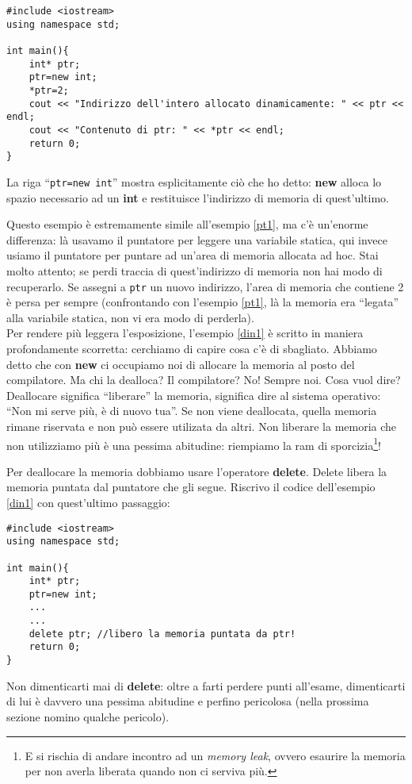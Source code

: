 \begin{lstlisting}
#include <iostream>
using namespace std;

int main(){
	int* ptr;
	ptr=new int;
	*ptr=2;
	cout << "Indirizzo dell'intero allocato dinamicamente: " << ptr << endl;
	cout << "Contenuto di ptr: " << *ptr << endl;
	return 0;
}
\end{lstlisting}\label{din1}

 La riga ``\lstinline|ptr=new int|'' mostra esplicitamente ciò che ho detto: \textbf{new} alloca lo spazio necessario ad un \textbf{int} e restituisce l'indirizzo di memoria di quest'ultimo.
 
 Questo esempio è estremamente simile all'esempio \ref{pt1}, ma c'è un'enorme differenza: là usavamo il puntatore per leggere una variabile statica, qui invece usiamo il puntatore per puntare ad un'area di memoria allocata ad hoc. Stai molto attento; se perdi traccia di quest'indirizzo di memoria non hai modo di recuperarlo. Se assegni a \verb|ptr| un nuovo indirizzo, l'area di memoria che contiene 2 è persa per sempre (confrontando con l'esempio \ref{pt1}, là la memoria era ``legata'' alla variabile statica, non vi era modo di perderla).\\
 
 Per rendere più leggera l'esposizione, l'esempio \ref{din1} è scritto in maniera profondamente scorretta: cerchiamo di capire cosa c'è di sbagliato. Abbiamo detto che con \textbf{new} ci occupiamo noi di allocare la memoria al posto del compilatore. Ma chi la dealloca? Il compilatore? No! Sempre noi. Cosa vuol dire? Deallocare significa ``liberare'' la memoria, significa dire al sistema operativo: ``Non mi serve più, è di nuovo tua''. Se non viene deallocata, quella memoria rimane riservata e non può essere utilizata da altri. Non liberare la memoria che non utilizziamo più è una pessima abitudine: riempiamo la ram di sporcizia\footnote{E si rischia di andare incontro ad un \emph{memory leak}, ovvero esaurire la memoria per non averla liberata quando non ci serviva più.}!
 
 Per deallocare la memoria dobbiamo usare l'operatore \textbf{delete}. Delete libera la memoria puntata dal puntatore che gli segue. Riscrivo il codice dell'esempio \ref{din1} con quest'ultimo passaggio:
 \begin{lstlisting}
#include <iostream>
using namespace std;
 
int main(){
	int* ptr;
	ptr=new int;
	...
	...
	delete ptr; //libero la memoria puntata da ptr!
	return 0;
}
 \end{lstlisting}
 Non dimenticarti mai di \textbf{delete}: oltre a farti perdere punti all'esame, dimenticarti di lui è davvero una pessima abitudine e perfino pericolosa (nella prossima sezione nomino qualche pericolo).
 

